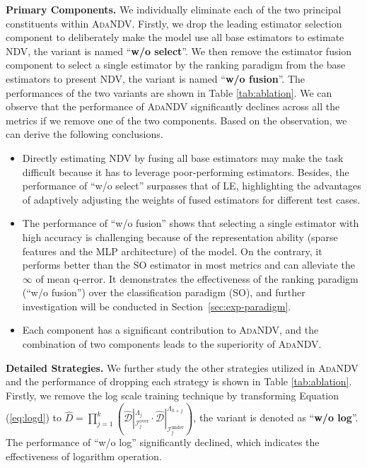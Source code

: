 \noindent\textbf{Primary Components.} 
We individually eliminate each of the two principal constituents within \textsc{AdaNDV}.
Firstly, we drop the leading estimator selection component to deliberately make the model use all base estimators to estimate NDV, the variant is named ``\textbf{{w/o} select}''. 
We then remove the estimator fusion component to select a single estimator by the ranking paradigm from the base estimators to present NDV, the variant is named ``\textbf{{w/o} fusion}''. 
The performances of the two variants are shown in Table \ref{tab:ablation}. 
We can observe that the performance of \textsc{AdaNDV} significantly declines across all the metrics if we remove one of the two components. Based on the observation, we can derive the following conclusions. 
\begin{itemize}[leftmargin=10pt]
\item Directly estimating NDV by fusing all base estimators may make the task difficult because it has to leverage poor-performing estimators. Besides, the performance of ``{w/o} select'' surpasses that of LE, highlighting the advantages of adaptively adjusting the weights of fused estimators for different test cases.
\item The performance of ``{w/o} fusion'' shows that selecting a single estimator with high accuracy is challenging because of the representation ability (sparse features and the MLP architecture) of the model. On the contrary, it performs better than the SO estimator in most metrics and can alleviate the $\infty$ of mean q-error. It demonstrates the effectiveness of the ranking paradigm (``{w/o} fusion'') over the classification paradigm (SO), and further investigation will be conducted in Section~\ref{sec:exp-paradigm}.
\item Each component has a significant contribution to \textsc{AdaNDV}, and the combination of two components leads to the superiority of \textsc{AdaNDV}. 
\end{itemize}




\noindent\textbf{Detailed Strategies.} 
We further study the other strategies utilized in \textsc{AdaNDV} and the performance of dropping each strategy is shown in Table \ref{tab:ablation}. 
Firstly, we remove the log scale training technique by transforming Equation (\ref{eq:logd}) to $\hat{D}=\prod_{j=1}^k(\hat{\mathcal{D}}|_{\mathcal{I}^\mathrm{over}_j}^{\Lambda_j}\cdot \hat{\mathcal{D}}|_{\mathcal{I}^\mathrm{under}_j}^{\Lambda_{k+j}})$, the variant is denoted as ``\textbf{{w/o} log}''. 
The performance of ``{{w/o} log}'' significantly declined, which indicates the effectiveness of logarithm operation. 


